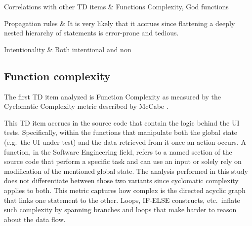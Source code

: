 \begin{table}[!htbp]
\begin{tabu}
			Correlations with other TD items & Functions Complexity, God functions\\
			\hline



			Propagation rules & It is very likely that it accrues since flattening a deeply nested hierarchy of statements is error-prone and tedious.\\
			\hline

			Intentionality & Both intentional and non \\
			\hline

		\end{tabu}
		\label{tab:res-dry-violations}
		\caption[DRY violations specification]{DRY violations specification according to guidelines specified by \cite{mapping_study_td}.}
	\end{table}

	\subsection{Function complexity}
	The first TD item analyzed is Function Complexity as measured by the Cyclomatic Complexity metric described by McCabe \cite{cyclomatic_complexity}.

    This TD item accrues in the source code that contain the logic behind the UI tests. Specifically, within the functions that manipulate both the global state (e.g.\ the UI under test) and the data retrieved from it once an action occurs. A function, in the Software Engineering field, refers to a named section of the source code that perform a specific task and can use an input or solely rely on modification of the mentioned global state. The analysis performed in this study does not differentiate between those two variants since cyclomatic complexity applies to both. This metric captures how complex is the directed acyclic graph that links one statement to the other. Loops, IF-ELSE constructs, etc.\ inflate such complexity by spanning branches and loops that make harder to reason about the data flow.

